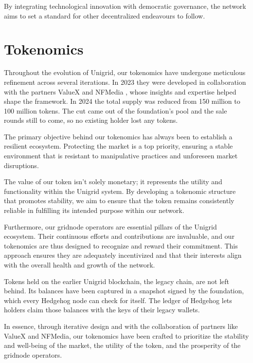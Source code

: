 \documentclass[a4paper,oneside]{article}
\begin{document}
By integrating technological innovation with democratic governance, the network aims to set a standard for other decentralized endeavours to follow.

\newpage
\section{Tokenomics}
Throughout the evolution of Unigrid, our tokenomics have undergone meticulous refinement across several iterations. In 2023 they were developed in collaboration with the partners ValueX \cite{valuex2023} and NFMedia \cite{nfmedia2023}, whose insights and expertise helped shape the framework. In 2024 the total supply was reduced from 150 million to 100 million tokens. The cut came out of the foundation's pool and the sale rounds still to come, so no existing holder lost any tokens.

The primary objective behind our tokenomics has always been to establish a resilient ecosystem. Protecting the market is a top priority, ensuring a stable environment that is resistant to manipulative practices and unforeseen market disruptions.

The value of our token isn't solely monetary; it represents the utility and functionality within the Unigrid system. By developing a tokenomic structure that promotes stability, we aim to ensure that the token remains consistently reliable in fulfilling its intended purpose within our network.

\begin{center}
	
\end{center}

Furthermore, our gridnode operators are essential pillars of the Unigrid ecosystem. Their continuous efforts and contributions are invaluable, and our tokenomics are thus designed to recognize and reward their commitment. This approach ensures they are adequately incentivized and that their interests align with the overall health and growth of the network.

Tokens held on the earlier Unigrid blockchain, the legacy chain, are not left behind. Its balances have been captured in a snapshot signed by the foundation, which every Hedgehog node can check for itself. The ledger of Hedgehog lets holders claim those balances with the keys of their legacy wallets.

\noindent In essence, through iterative design and with the collaboration of partners like ValueX and NFMedia, our tokenomics have been crafted to prioritize the stability and well-being of the market, the utility of the token, and the prosperity of the gridnode operators.
\end{document}
